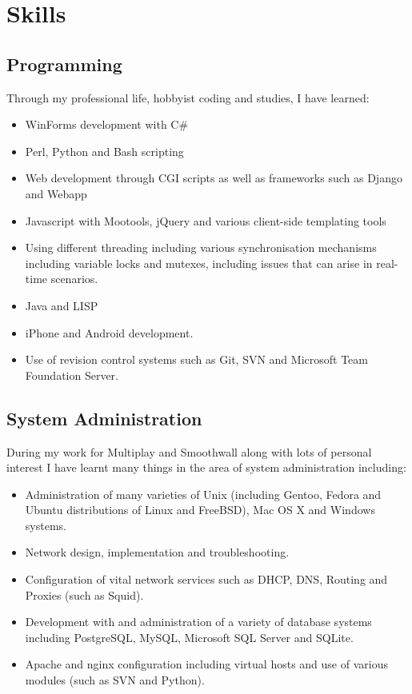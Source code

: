 \documentclass[11pt]{report}
\begin{document}
\section*{Skills}
\subsection*{Programming}
Through my professional life, hobbyist coding and studies, I have learned: 
\begin{itemize}[itemsep=2pt ,parsep=2pt]
\item WinForms development with C\#
\item Perl, Python and Bash scripting
\item Web development through CGI scripts as well as frameworks such as Django and Webapp
\item Javascript with Mootools, jQuery and various client-side templating tools
\item Using different threading including various synchronisation mechanisms including variable locks and mutexes, including issues that can arise in real-time scenarios.
\item Java and LISP
\item iPhone and Android development.
\item Use of revision control systems such as Git, SVN and Microsoft Team Foundation Server.
\end{itemize}
\subsection*{System Administration}
During my work for Multiplay and Smoothwall along with lots of personal interest I have learnt many things in the area of system administration including:
\begin{itemize}[itemsep=2pt ,parsep=2pt]
\item Administration of many varieties of Unix (including Gentoo, Fedora and Ubuntu distributions of Linux and FreeBSD), Mac OS X and Windows systems.
\item Network design, implementation and troubleshooting.
\item Configuration of vital network services such as DHCP, DNS, Routing and Proxies (such as Squid).
\item Development with and administration of a variety of database systems including PostgreSQL, MySQL, Microsoft SQL Server and SQLite.
\item Apache and nginx configuration including virtual hosts and use of various modules (such as SVN and Python).
\end{itemize}
\end{document}
